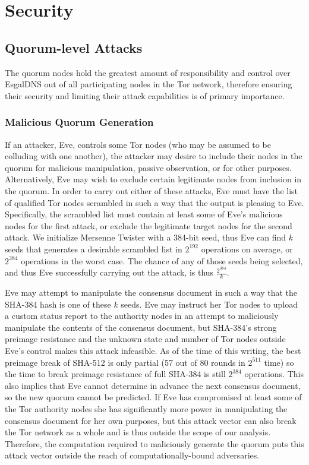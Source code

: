 \section{Security}

\subsection{Quorum-level Attacks}

The quorum nodes hold the greatest amount of responsibility and control over EsgalDNS out of all participating nodes in the Tor network, therefore ensuring their security and limiting their attack capabilities is of primary importance.

\subsubsection{Malicious Quorum Generation}

If an attacker, Eve, controls some Tor nodes (who may be assumed to be colluding with one another), the attacker may desire to include their nodes in the quorum for malicious manipulation, passive observation, or for other purposes. Alternatively, Eve may wish to exclude certain legitimate nodes from inclusion in the quorum. In order to carry out either of these attacks, Eve must have the list of qualified Tor nodes scrambled in such a way that the output is pleasing to Eve. Specifically, the scrambled list must contain at least some of Eve's malicious nodes for the first attack, or exclude the legitimate target nodes for the second attack. We initialize Mersenne Twister with a 384-bit seed, thus Eve can find $ k $ seeds that generates a desirable scrambled list in $ 2^{192} $ operations on average, or $ 2^{384} $ operations in the worst case. The chance of any of those seeds being selected, and thus Eve successfully carrying out the attack, is thus $ \frac{2^{384}}{k} $.

Eve may attempt to manipulate the consensus document in such a way that the SHA-384 hash is one of these $ k $ seeds. Eve may instruct her Tor nodes to upload a custom status report to the authority nodes in an attempt to maliciously manipulate the contents of the consensus document, but SHA-384's strong preimage resistance and the unknown state and number of Tor nodes outside Eve's control makes this attack infeasible. As of the time of this writing, the best preimage break of SHA-512 is only partial (57 out of 80 rounds in $ 2^{511} $ time\cite{li2012converting}) so the time to break preimage resistance of full SHA-384 is still $ 2^{384} $ operations. This also implies that Eve cannot determine in advance the next consensus document, so the new quorum cannot be predicted. If Eve has compromised at least some of the Tor authority nodes she has significantly more power in manipulating the consensus document for her own purposes, but this attack vector can also break the Tor network as a whole and is thus outside the scope of our analysis. Therefore, the computation required to maliciously generate the quorum puts this attack vector outside the reach of computationally-bound adversaries.

